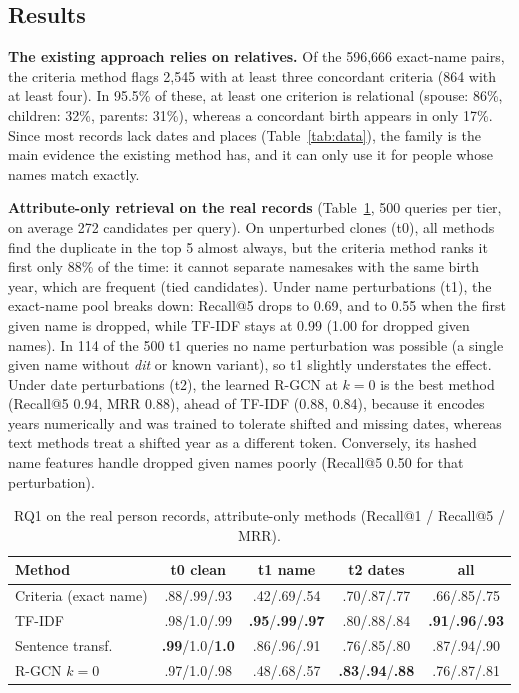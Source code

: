 \subsection*{Results}

\textbf{The existing approach relies on relatives.}
Of the 596{,}666 exact-name pairs, the criteria method flags 2{,}545 with at least three concordant criteria (864 with at least four). In 95.5\% of these, at least one criterion is relational (spouse: 86\%, children: 32\%, parents: 31\%), whereas a concordant birth appears in only 17\%. Since most records lack dates and places (Table~\ref{tab:data}), the family is the main evidence the existing method has, and it can only use it for people whose names match exactly.

\textbf{Attribute-only retrieval on the real records} (Table~\ref{tab:real}, 500 queries per tier, on average 272 candidates per query).
On unperturbed clones (t0), all methods find the duplicate in the top 5 almost always, but the criteria method ranks it first only 88\% of the time: it cannot separate namesakes with the same birth year, which are frequent (tied candidates). Under name perturbations (t1), the exact-name pool breaks down: Recall@5 drops to 0.69, and to 0.55 when the first given name is dropped, while TF-IDF stays at 0.99 (1.00 for dropped given names). In 114 of the 500 t1 queries no name perturbation was possible (a single given name without \textit{dit} or known variant), so t1 slightly understates the effect. Under date perturbations (t2), the learned R-GCN at $k=0$ is the best method (Recall@5 0.94, MRR 0.88), ahead of TF-IDF (0.88, 0.84), because it encodes years numerically and was trained to tolerate shifted and missing dates, whereas text methods treat a shifted year as a different token. Conversely, its hashed name features handle dropped given names poorly (Recall@5 0.50 for that perturbation).

\begin{table}[h]
\centering
\caption{RQ1 on the real person records, attribute-only methods (Recall@1 / Recall@5 / MRR).}
\label{tab:real}
\setlength{\tabcolsep}{3pt}
\begin{tabular}{lcccc}
\hline
Method & t0 clean & t1 name & t2 dates & all \\
\hline
Criteria (exact name) & .88/.99/.93 & .42/.69/.54 & .70/.87/.77 & .66/.85/.75 \\
TF-IDF & .98/1.0/.99 & \textbf{.95}/\textbf{.99}/\textbf{.97} & .80/.88/.84 & \textbf{.91}/\textbf{.96}/\textbf{.93} \\
Sentence transf. & \textbf{.99}/1.0/\textbf{1.0} & .86/.96/.91 & .76/.85/.80 & .87/.94/.90 \\
R-GCN $k=0$ & .97/1.0/.98 & .48/.68/.57 & \textbf{.83}/\textbf{.94}/\textbf{.88} & .76/.87/.81 \\
\hline
\end{tabular}
\end{table}

